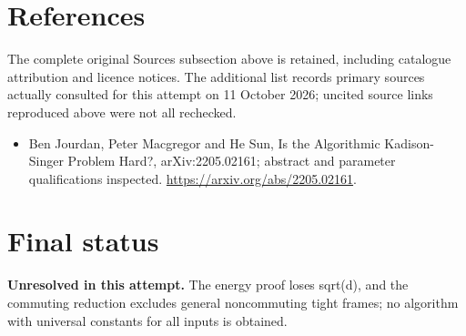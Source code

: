 \documentclass[11pt]{article}
\begin{document}
\section{References}
The complete original Sources subsection above is retained, including catalogue attribution and licence notices. The additional list records primary sources actually consulted for this attempt on 11 October 2026; uncited source links reproduced above were not all rechecked.
\begin{itemize}
\item Ben Jourdan, Peter Macgregor and He Sun, Is the Algorithmic Kadison-Singer Problem Hard?, arXiv:2205.02161; abstract and parameter qualifications inspected. \url{https://arxiv.org/abs/2205.02161}.
\end{itemize}
\section{Final status}
\textbf{Unresolved in this attempt.} The energy proof loses sqrt(d), and the commuting reduction excludes general noncommuting tight frames; no algorithm with universal constants for all inputs is obtained.
\end{document}
